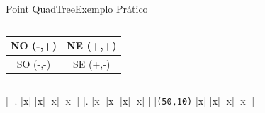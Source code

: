 \documentclass[red, tikz, aspectratio=169, xcolor=dvipsnames]{beamer}
\begin{document}
			\begin{frame}[fragile]{Point QuadTree}{Exemplo Prático}
				\centering
				\vspace{-40px}
				\begin{columns}
					\begin{column}{0.48\textwidth}
						\centering
						\begin{tabular}{|c|c|}
							\hline 
							NO (-,+) & NE (+,+) \\ 
							\hline 
							SO (-,-) & SE (+,-) \\ 
							\hline 
						\end{tabular} 
					\end{column}
					\begin{column}{0.5\textwidth}
						\centering
						\fbox{
							\begin{forest}
								[\texttt{(x,y)}
								[NO]
								[NE]
								[SO]
								[SE]
								]
						\end{forest}}
					\end{column}
				\end{columns}
				\vspace{10px}
				
				\vspace{10px}
				
				\begin{minipage}{\textwidth}
					\centering
					
					\begin{forest}
						[\texttt{(35,40)}
						[.
						[x]
						[x]
						[x]
						[x]
						]
						[.
						[x]
						[x]
						[x]
						[x]
						]
						[.
						[x]
						[x]
						[x]
						[x]
						]
						[\texttt{(50,10)}
						[x]
						[x]
						[x]
						[x]
						]
						]
					\end{forest}
				\end{minipage}
			\end{frame}
			
\end{document}
